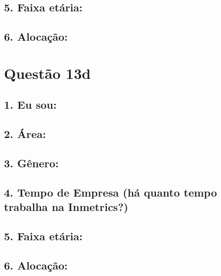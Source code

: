 \documentclass[]{book}
\begin{document}
\hypertarget{faixa-etaria-19}{%
\subsection{5. Faixa etária:}\label{faixa-etaria-19}}

\hypertarget{alocacao-19}{%
\subsection{6. Alocação:}\label{alocacao-19}}

\hypertarget{questao-13d}{%
\section{Questão 13d}\label{questao-13d}}

\hypertarget{eu-sou-20}{%
\subsection{1. Eu sou:}\label{eu-sou-20}}

\hypertarget{area-20}{%
\subsection{2. Área:}\label{area-20}}

\hypertarget{genero-20}{%
\subsection{3. Gênero:}\label{genero-20}}

\hypertarget{tempo-de-empresa-ha-quanto-tempo-trabalha-na-inmetrics-20}{%
\subsection{4. Tempo de Empresa (há quanto tempo trabalha na Inmetrics?)}\label{tempo-de-empresa-ha-quanto-tempo-trabalha-na-inmetrics-20}}

\hypertarget{faixa-etaria-20}{%
\subsection{5. Faixa etária:}\label{faixa-etaria-20}}

\hypertarget{alocacao-20}{%
\subsection{6. Alocação:}\label{alocacao-20}}
\end{document}
